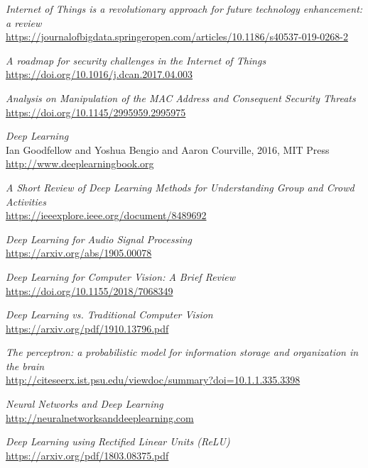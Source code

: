 \begin{thebibliography}{99}

\renewcommand{\baselinestretch}{1} 
\small

\textit{Internet of Things is a revolutionary approach for future technology enhancement: a review}
\\\url{https://journalofbigdata.springeropen.com/articles/10.1186/s40537-019-0268-2}

\textit{A roadmap for security challenges in the Internet of Things}
\\\url{https://doi.org/10.1016/j.dcan.2017.04.003}

\textit{Analysis on Manipulation of the MAC Address and Consequent Security Threats}
\\\url{https://doi.org/10.1145/2995959.2995975}

\textit{Deep Learning}
\\Ian Goodfellow and Yoshua Bengio and Aaron Courville, 2016, MIT Press
\\\url{http://www.deeplearningbook.org}

\textit{A Short Review of Deep Learning Methods for Understanding Group and Crowd Activities}
\\\url{https://ieeexplore.ieee.org/document/8489692}

\textit{Deep Learning for Audio Signal Processing}
\\\url{https://arxiv.org/abs/1905.00078}

\textit{Deep Learning for Computer Vision: A Brief Review}
\\\url{https://doi.org/10.1155/2018/7068349}

\textit{Deep Learning vs. Traditional Computer Vision}
\\\url{https://arxiv.org/pdf/1910.13796.pdf}



\textit{The perceptron: a probabilistic model for information storage and organization in the brain}
\\\url{http://citeseerx.ist.psu.edu/viewdoc/summary?doi=10.1.1.335.3398}

\textit{Neural Networks and Deep Learning}
\\\url{http://neuralnetworksanddeeplearning.com}

\textit{Deep Learning using Rectified Linear Units (ReLU)}
\\\url{https://arxiv.org/pdf/1803.08375.pdf}


\end{thebibliography}
